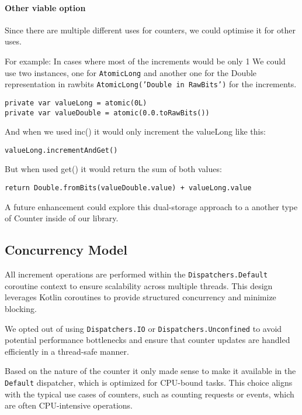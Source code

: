
\paragraph{Other viable option}
Since there are multiple different uses for counters, we could optimise it for other uses.

For example:
In cases where most of the increments would be only 1
We could use two instances, one for \texttt{AtomicLong} and another one for the Double representation in rawbits \texttt{AtomicLong('Double in RawBits')} for the increments.


\begin{verbatim}
private var valueLong = atomic(0L)
private var valueDouble = atomic(0.0.toRawBits())
\end{verbatim}

And when we used inc() it would only increment the valueLong like this:
\begin{verbatim}
valueLong.incrementAndGet()
\end{verbatim}


But when used get() it would return the sum of both values:
\begin{verbatim}
return Double.fromBits(valueDouble.value) + valueLong.value
\end{verbatim}

A future enhancement could explore this dual-storage approach to a another type of Counter inside of our library.



\subsection{Concurrency Model}
All increment operations are performed within the \texttt{Dispatchers.Default} coroutine context to ensure scalability across multiple threads. This design leverages Kotlin coroutines to provide structured concurrency and minimize blocking.

We opted out of using \texttt{Dispatchers.IO} or \texttt{Dispatchers.Unconfined} to avoid potential performance bottlenecks and ensure that counter updates are handled efficiently in a thread-safe manner.

Based on the nature of the counter it only made sense to make it available in the \texttt{Default} dispatcher, which is optimized for CPU-bound tasks. This choice aligns with the typical use cases of counters, such as counting requests or events, which are often CPU-intensive operations.

